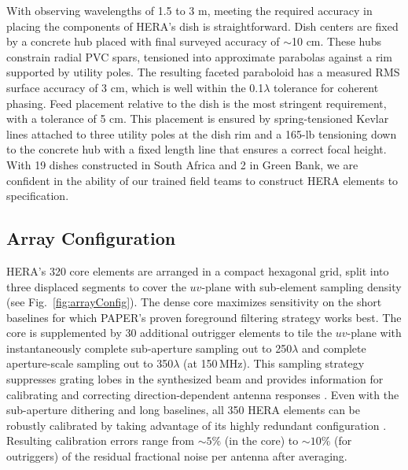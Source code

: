 \documentclass[preprint,11pt]{aastex}
\begin{document}
With observing wavelengths of 1.5 to 3 m, meeting the required accuracy
in placing the components of HERA's dish is straightforward.
Dish centers are fixed
by a concrete hub placed with final surveyed accuracy of $\sim$10 cm.  These
hubs constrain radial PVC spars, tensioned into approximate parabolas against a
rim supported by utility poles.  The resulting faceted paraboloid has
a measured RMS surface accuracy of 3 cm, which is well within the 0.1$\lambda$ tolerance for
coherent phasing.  Feed placement relative to the dish is the most stringent requirement, with
a tolerance of 5 cm.  This placement is ensured by spring-tensioned Kevlar lines attached to
three utility poles at the dish rim and a 165-lb tensioning down to the concrete hub with
a fixed length line that ensures a correct focal height.  With 19 dishes constructed in South Africa
and 2 in Green Bank, we are confident in the ability of our trained field teams to construct HERA
elements to specification.


\subsection{Array Configuration}
\label{sec:arrayConfig}

\noindent HERA's 320 core elements are arranged in a compact hexagonal grid, split into three displaced segments 
to cover the $uv$-plane with sub-element sampling density (see Fig.~\ref{fig:arrayConfig}). The dense core maximizes 
sensitivity on the short baselines for which PAPER's proven foreground filtering strategy works best.
The core is supplemented by 30 additional outrigger elements 
to tile the $uv$-plane with instantaneously complete sub-aperture 
sampling out to 250$\lambda$ and complete aperture-scale sampling out to 350$\lambda$ (at 150\,MHz). This sampling 
strategy suppresses grating lobes in the synthesized beam and provides information for calibrating and correcting 
direction-dependent antenna responses \citep{dillon_parsons2016}.
Even with the sub-aperture dithering and long baselines, all 350 HERA elements can be robustly calibrated by taking advantage of 
its highly redundant configuration \citep{liu_et_al2010,zheng_et_al2014}. 
Resulting calibration errors range from $\sim5\%$ (in the core) to $\sim10\%$ (for outriggers)
of the residual fractional noise per antenna after averaging.
\end{document}
